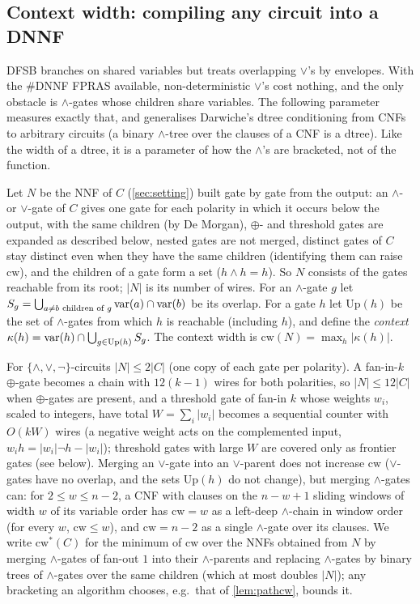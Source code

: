 \subsection{Context width: compiling any circuit into a DNNF}\label{sec:ctxwidth}

DFSB branches on shared variables but treats overlapping $\vee$'s by envelopes.
With the \#DNNF FPRAS available, non-deterministic $\vee$'s cost nothing, and
the only obstacle is $\wedge$-gates whose children share variables. The following
parameter measures exactly that, and generalises Darwiche's dtree conditioning
\cite{darwiche2001dnnf} from CNFs to arbitrary circuits (a binary $\wedge$-tree over
the clauses of a CNF is a dtree). Like the width of a dtree, it is a parameter of
how the $\wedge$'s are bracketed, not of the function.

\begin{definition}
Let $N$ be the NNF of $C$ (\cref{sec:setting}) built gate by gate from the output:
an $\wedge$- or $\vee$-gate of $C$ gives one gate for each polarity in which it occurs
below the output, with the same children (by De Morgan), $\oplus$- and threshold
gates are expanded as described below, nested gates are not merged, distinct gates
of $C$ stay distinct even when they have the same children (identifying them can
raise $\mathrm{cw}$), and the children of a gate form a set ($h\wedge h=h$). So $N$
consists of the gates reachable from its root; $|N|$ is its number of wires. For an
$\wedge$-gate $g$ let $S_g=\bigcup_{a\ne b\text{ children of }g}\mathrm{var}(a)\cap\mathrm{var}(b)$ be its overlap.
For a gate $h$ let $\mathrm{Up}(h)$ be the set of $\wedge$-gates from which $h$ is
reachable (including $h$), and define the \emph{context}
$\kappa(h)=\mathrm{var}(h)\cap\bigcup_{g\in\mathrm{Up}(h)}S_g$. The context width is
$\mathrm{cw}(N)=\max_h|\kappa(h)|$.
\end{definition}

For $\{\wedge,\vee,\neg\}$-circuits $|N|\le2|C|$ (one copy of each gate per
polarity). A fan-in-$k$ $\oplus$-gate becomes a chain with $12(k-1)$ wires for both
polarities, so $|N|\le12|C|$ when $\oplus$-gates are present, and a threshold gate of
fan-in $k$ whose weights $w_i$, scaled to integers, have total $W=\sum_i|w_i|$ becomes
a sequential counter with $O(kW)$ wires (a negative weight acts on the complemented
input, $w_ih=|w_i|\neg h-|w_i|$); threshold gates with large $W$ are covered only as
frontier gates (see below). Merging an $\vee$-gate into an $\vee$-parent does not
increase $\mathrm{cw}$ ($\vee$-gates have no overlap, and the sets $\mathrm{Up}(h)$ do
not change), but merging $\wedge$-gates can: for $2\le w\le n-2$, a CNF with clauses on
the $n-w+1$ sliding windows of width $w$ of its variable order has $\mathrm{cw}=w$ as a
left-deep $\wedge$-chain in window order (for every $w$, $\mathrm{cw}\le w$), and
$\mathrm{cw}=n-2$ as a single $\wedge$-gate over its clauses. We write
$\mathrm{cw}^*(C)$ for the minimum of $\mathrm{cw}$ over the NNFs obtained from $N$ by
merging $\wedge$-gates of fan-out $1$ into their $\wedge$-parents and replacing
$\wedge$-gates by binary trees of $\wedge$-gates over the same children (which at most
doubles $|N|$); any bracketing an algorithm chooses, e.g.\ that of \cref{lem:pathcw},
bounds it.


